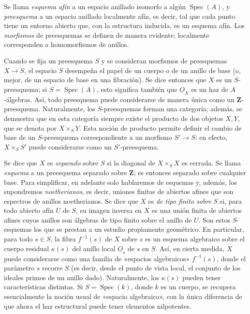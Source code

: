 \documentclass[11pt,twoside,openany]{book}
\numberwithin{equation}{section}
\newcommand{\Osh}{\underline{O}}
\theoremstyle{plain}
\theoremstyle{definition}
\theoremstyle{remark}
\theoremstyle{plain}
\theoremstyle{definition}
\theoremstyle{remark}
\begin{document}
Se llama \emph{esquema afín} a un espacio anillado isomorfo a algún
$\operatorname{Spec}(A)$, y \emph{preesquema} a un espacio anillado localmente
afín, es decir, tal que cada punto tiene un entorno abierto que, con la
estructura inducida, es un esquema afín. Los \emph{morfismos} de preesquemas se
definen de manera evidente; localmente corresponden a homomorfismos de anillos.

Cuando se fija un preesquema $S$ y se consideran morfismos de preesquemas
$X\longrightarrow S$, el espacio $S$ desempeña el papel de un cuerpo o de un
anillo de base (o, mejor, de un espacio de base en una fibración). Se dice
entonces que $X$ es un $S$-preesquema; si $S=\operatorname{Spec}(A)$, esto
significa también que $\Osh_X$ es un haz de $A$-álgebras. Así, todo preesquema
puede considerarse de manera única como un $\mathbf Z$-preesquema. Naturalmente,
los $S$-preesquemas forman una categoría; además, se demuestra que en esta
categoría siempre existe el producto de dos objetos $X,Y$, que se denota por
$X\times_S Y$. Esta noción de producto permite definir el cambio de base de un
$S$-preesquema correspondiente a un morfismo $S'\longrightarrow S$: en efecto,
$X\times_S S'$ puede considerarse como un $S'$-preesquema.

Se dice que $X$ es \emph{separado} sobre $S$ si la diagonal de
$X\times_S X$ es cerrada. Se llama \emph{esquema} a un preesquema separado
sobre $\mathbf Z$; es entonces separado sobre cualquier base. Para simplificar,
en adelante solo hablaremos de esquemas y, además, los supondremos
\emph{noetherianos}, es decir, uniones finitas de abiertos afines que son
espectros de anillos noetherianos. Se dice que $X$ es \emph{de tipo finito
sobre} $S$ si, para todo abierto afín $U$ de $S$, su imagen inversa en $X$ es
una unión finita de abiertos afines cuyos anillos son álgebras de tipo finito
sobre el anillo de $U$. Son estos $S$-esquemas los que se prestan a un estudio
propiamente geométrico. En particular, para todo $s\in S$, la fibra
$f^{-1}(s)$ de $X$ sobre $s$ es un esquema algebraico sobre el cuerpo residual
$\kappa(s)$ del anillo local $\Osh_s$ de $s$ en $S$. Así, en cierta medida, $X$
puede considerarse como una familia de «espacios algebraicos» $f^{-1}(s)$, donde
el parámetro $s$ recorre $S$ (es decir, desde el punto de vista local, el
conjunto de los ideales primos de un anillo dado). Naturalmente, los
$\kappa(s)$ pueden tener características distintas. Si
$S=\operatorname{Spec}(k)$, donde $k$ es un cuerpo, se recupera esencialmente la
noción usual de «espacio algebraico», con la única diferencia de que ahora el
haz estructural puede tener elementos nilpotentes.
\end{document}
